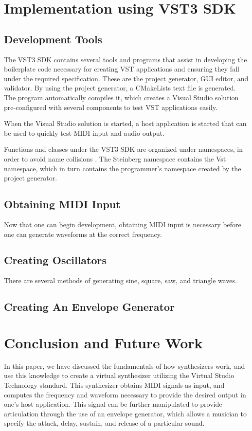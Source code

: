 \documentclass[12pt]{article}
\begin{document}
\newpage
\section{Implementation using VST3 SDK}

\subsection{Development Tools}
The VST3 SDK contains several tools and programs that assist in developing the boilerplate code necessary for creating VST applications and ensuring they fall under the required specification. These are the project generator, GUI editor, and validator. By using the project generator, a CMakeLists text file is generated. The program automatically compiles it, which creates a Visual Studio solution pre-configured with several components to test VST applications easily. 

When the Visual Studio solution is started, a host application is started that can be used to quickly test MIDI input and audio output.

Functions and classes under the VST3 SDK are organized under namespaces, in order to avoid name collisions \cite{Pirkle_2015}. The Steinberg namespace contains the Vst namespace, which in turn contains the programmer's namespace created by the project generator. 

\subsection{Obtaining MIDI Input}
Now that one can begin development, obtaining MIDI input is necessary before one can generate waveforms at the correct frequency. 

\subsection{Creating Oscillators}
There are several methods of generating sine, square, saw, and triangle waves. 

\subsection{Creating An Envelope Generator}

\newpage
\section{Conclusion and Future Work}
In this paper, we have discussed the fundamentals of how synthesizers work, and use this knowledge to create a virtual synthesizer utilizing the Virtual Studio Technology standard. This synthesizer obtains MIDI signals as input, and computes the frequency and waveform necessary to provide the desired output in one's host application. This signal can be further manipulated to provide articulation through the use of an envelope generator, which allows a musician to specify the attack, delay, sustain, and release of a particular sound.
\end{document}
